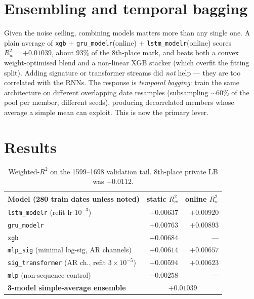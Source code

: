 \documentclass[11pt]{article}
\newcommand{\Rw}{R^2_w}
\begin{document}
\section{Ensembling and temporal bagging}
Given the noise ceiling, combining models matters more than any single one. A
plain average of \texttt{xgb} $+$ \texttt{gru\_modelr}(online) $+$
\texttt{lstm\_modelr}(online) scores $\Rw = +0.01039$, about 93\% of the
8th-place mark, and beats both a convex weight-optimised blend and a non-linear
XGB stacker (which overfit the fitting split). Adding signature or transformer
streams did \emph{not} help --- they are too correlated with the RNNs. The
response is \emph{temporal bagging}: train the same architecture on different
overlapping date resamples (subsampling $\sim$60\% of the pool per member,
different seeds), producing decorrelated members whose average a simple mean can
exploit. This is now the primary lever.

\section{Results}

\begin{table}[h]
\centering
\small
\begin{tabular}{lrr}
\toprule
Model (280 train dates unless noted) & static $\Rw$ & online $\Rw$ \\
\midrule
\texttt{lstm\_modelr} (refit lr $10^{-3}$)      & $+0.00637$ & $\mathbf{+0.00920}$ \\
\texttt{gru\_modelr}                            & $+0.00763$ & $+0.00893$ \\
\texttt{xgb}                                    & $+0.00684$ & --- \\
\texttt{mlp\_sig} (minimal log-sig, AR channels)& $+0.00614$ & $+0.00657$ \\
\texttt{sig\_transformer} (AR ch., refit $3\!\times\!10^{-5}$) & $+0.00594$ & $+0.00623$ \\
\texttt{mlp} (non-sequence control)             & $-0.00258$ & --- \\
\midrule
\textbf{3-model simple-average ensemble}        & \multicolumn{2}{c}{$\mathbf{+0.01039}$} \\
\bottomrule
\end{tabular}
\caption{Weighted-$R^2$ on the 1599--1698 validation tail. 8th-place private LB
was $+0.0112$.}
\end{table}
\end{document}
